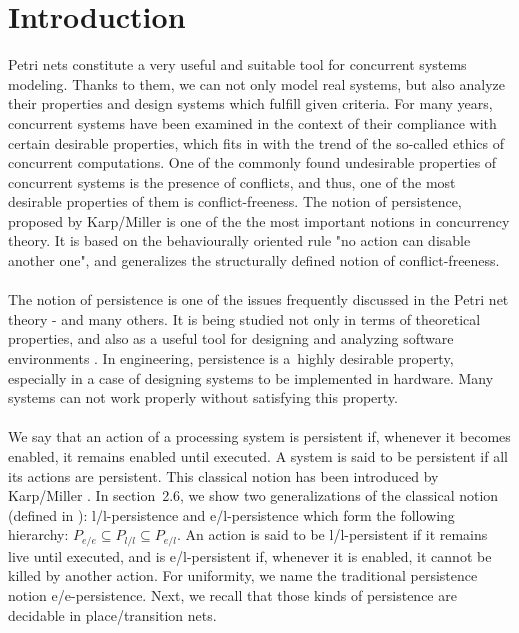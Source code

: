 \documentclass[a4paper]{llncs}
\begin{document}
\section{Introduction}

Petri nets constitute a very useful and suitable tool for concurrent systems modeling. Thanks to them, we can not only model real systems, but also analyze their properties and design systems which fulfill given criteria. For many years, concurrent systems have been examined in the context of their compliance with certain desirable properties, which fits in with the trend of the so-called ethics of concurrent computations. One of the commonly found undesirable properties of concurrent systems is the presence of conflicts, and thus, one of the most desirable properties of them is conflict-freeness. The notion of persistence, proposed by Karp/Miller \cite{KarpMiller} is one of the the most important notions in concurrency theory. It is based on the behaviourally oriented rule "no action can disable another one", and generalizes the structurally defined notion of conflict-freeness.
\\ \\
The notion of persistence is one of the issues frequently discussed in the Petri net theory - \cite{BestDar,Grabowski,Hack,LandRob,Mayr,Koutny} and many others. It is being studied not only in terms of theoretical properties, and also as a useful tool for designing and analyzing software environments \cite{BestEsparza}. In engineering, persistence is a~highly desirable property, especially in a case of designing systems to be implemented in hardware. Many systems can not work properly without satisfying this property.
\\ \\
We say that an action of a processing system is persistent if, whenever it becomes enabled, it remains enabled until executed. A system is said to be persistent if all its actions are persistent. This classical notion has been introduced by Karp/Miller \cite{KarpMiller}. In section~2.6, we show two generalizations of the classical notion (defined in \cite{BarOch}): l/l-persistence and e/l-persistence which form the following hierarchy: $P_{e/e}\subseteq P_{l/l}\subseteq P_{e/l}$. An action is said to be l/l-persistent if it remains live until executed, and is e/l-persistent if, whenever it is enabled, it cannot be killed by another action. For uniformity, we name the traditional persistence notion e/e-persistence. Next, we recall that those kinds of persistence are decidable in place/transition nets.
\end{document}
